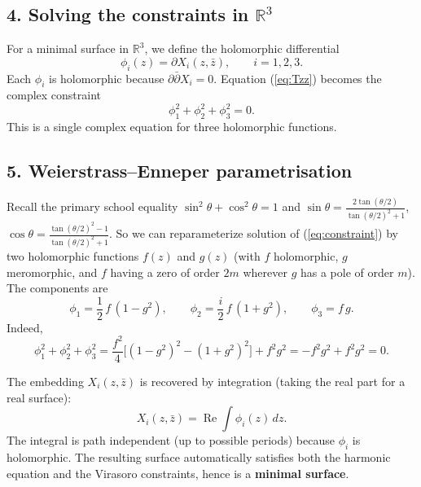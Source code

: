 \subsection*{4. Solving the constraints in $\mathbb{R}^3$}
For a minimal surface in $\mathbb{R}^3$, we define the holomorphic differential
\[
\phi_i(z) = \partial X_i(z,\bar{z}), \qquad i=1,2,3.
\]
Each $\phi_i$ is holomorphic because $\partial\bar{\partial}X_i=0$. Equation (\ref{eq:Tzz}) becomes the complex constraint
\begin{equation}
\phi_1^2 + \phi_2^2 + \phi_3^2 = 0. \label{eq:constraint}
\end{equation}
This is a single complex equation for three holomorphic functions.

\subsection*{5. Weierstrass–Enneper parametrisation}
Recall the primary school equality $\sin^2\theta+\cos^2\theta=1$ and $\sin\theta=\frac{2\tan(\theta/2)}{\tan(\theta/2)^2+1}$, $\cos\theta=\frac{\tan(\theta/2)^2-1}{\tan(\theta/2)^2+1}$.
So we can reparameterize solution of (\ref{eq:constraint}) by two holomorphic functions $f(z)$ and $g(z)$ (with $f$ holomorphic, $g$ meromorphic, and $f$ having a zero of order $2m$ wherever $g$ has a pole of order $m$). The components are
\begin{equation}
\boxed{
\phi_1 = \frac{1}{2}\,f\,(1-g^2), \qquad
\phi_2 = \frac{i}{2}\,f\,(1+g^2), \qquad
\phi_3 = f\,g.
}\label{eq:WE}
\end{equation}
Indeed,
\[
\phi_1^2+\phi_2^2+\phi_3^2 = \frac{f^2}{4}\big[(1-g^2)^2 - (1+g^2)^2\big] + f^2g^2 = -f^2g^2 + f^2g^2 = 0.
\]

The embedding $X_i(z,\bar{z})$ is recovered by integration (taking the real part for a real surface):
\begin{equation}
X_i(z,\bar{z}) = \operatorname{Re} \int \phi_i(z)\,dz.
\end{equation}
The integral is path independent (up to possible periods) because $\phi_i$ is holomorphic. The resulting surface automatically satisfies both the harmonic equation and the Virasoro constraints, hence is a \textbf{minimal surface}.
